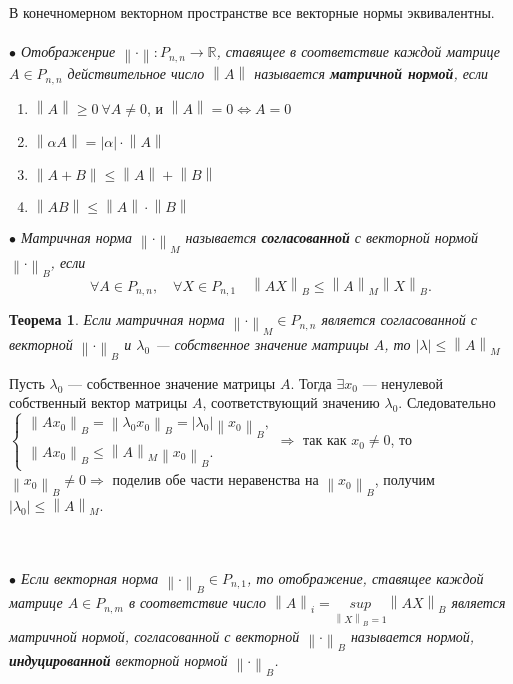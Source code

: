 В конечномерном векторном пространстве все векторные нормы эквивалентны.\\\\
\textit{$\bullet$ Отображенрие $\left \| \cdot \right \|:P_{n,n} \rightarrow \mathbb{R}$, ставящее в соответствие каждой матрице $A\in P_{n,n}$ действительное число $\left \| A \right \|$ называется \textbf{матричной нормой}, если}
\begin{enumerate}
	\item $\left \|A\right \| \geqslant 0\ \forall A\ne 0$, и $\left \|A\right \| = 0 \Leftrightarrow A = 0$
	\item $\left \|\alpha A\right \|=|\alpha|\cdot\left \|A\right \|$
	\item  $\left \|A+B\right \| \leqslant \left \|A\right \| + \left \|B\right \|$
	\item $\left \|AB\right \| \leqslant \left \|A\right \|\cdot  \left \|B\right \|$
\end{enumerate}
\textit{$\bullet$ Матричная норма $\left \|\cdot\right \|_M$ называется \textbf{согласованной} с векторной нормой $\left \|\cdot\right \|_B$, если} $$\forall A\in P_{n,n},\quad \forall X \in P_{n,1}\quad \left \|AX\right \|_B\leqslant \left \|A\right \|_M\left \|X\right \|_B.$$
\newtheorem*{th14_10_1}{Теорема}\begin{th14_10_1}Если матричная норма $\left \|\cdot\right \|_M \in P_{n,n}$ является согласованной с векторной $\left \|\cdot\right \|_B$ и $\lambda_0$ --- собственное значение матрицы $A$, то $|\lambda| \leqslant \left \|A\right \|_M$
\end{th14_10_1}\begin{Proof}
	Пусть $\lambda_0$ --- собственное значение матрицы $A$. Тогда $\exists x_0$ --- ненулевой собственный вектор матрицы $A$, соответствующий значению $\lambda_0$. Следовательно\\
	$\begin{cases}
		\left \|Ax_0\right \|_B = \left \|\lambda_0 x_0\right \|_B = |\lambda_0| \left \|x_0\right \|_B,\\
		\left \|A x_0\right \|_B \leqslant \left \|A\right \|_M \left \| x_0\right \|_B.
	\end{cases} \Rightarrow$ так как $x_0\ne 0$, то $\left \| x_0\right \|_B \ne 0\Rightarrow$ поделив обе части неравенства на $\left \| x_0\right \|_B$, получим $|\lambda_0|\leqslant \left \|A\right \|_M$.
\end{Proof}\\\\
\textit{$\bullet$ Если векторная норма $\left \|\cdot\right \|_B\in P_{n,1}$, то отображение, ставящее каждой матрице $A\in P_{n,m}$ в соответствие число $\left \|A\right \|_i = \underset{\left \|X\right \|_B = 1}{sup} \left \|AX\right \|_B$ является матричной нормой, согласованной с векторной $\left \|\cdot\right \|_B$ называется нормой, \textbf{индуцированной} векторной нормой $\left \|\cdot\right \|_B$.}
